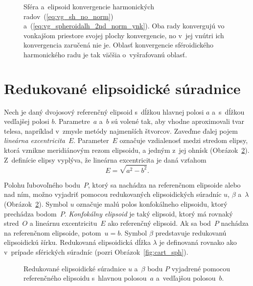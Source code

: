 \documentclass[a4paper, 12pt]{book}
\begin{document}
\begin{figure}
\centering

\caption{Sféra a~elipsoid konvergencie harmonických 
radov~(\ref{eq:vg_sh_no_norm}) a~(\ref{eq:vg_spheroidalh_2nd_norm_ynk}).  Oba 
rady konvergujú vo vonkajšom priestore svojej plochy konvergencie, no v~jej 
vnútri ich konvergencia zaručená nie je.  Oblasť konvergencie sféroidického 
harmonického radu je tak väčšia o~vyšrafovanú oblasť.}
\label{fig:spheroidal_harmonics_convergence}
\end{figure}


\section{Redukované elipsoidické súradnice}
\label{sec:reduced_ell_coords}

Nech je daný dvojosový referenčný elipsoid s~dĺžkou hlavnej polosi $a$ 
a~s~dĺžkou vedľajšej polosi $b$.  Parametre~$a$ a~$b$ sú volené tak, aby vhodne 
aproximovali tvar telesa, napríklad v~zmysle metódy najmenších štvorcov.  
Zaveďme ďalej pojem \emph{lineárna excentricita}~$E$.  Parameter~$E$ označuje 
vzdialenosť medzi stredom elipsy, ktorá vznikne meridiánovým rezom elipsoidu, 
a jedným z~jej ohnísk (Obrázok~\ref{fig:reduced_ell_coords}).  Z~definície 
elipsy vyplýva, že lineárna excentricita je daná vzťahom
%
\begin{equation}
\label{eq:linear_eccentricity}
E = \sqrt{a^2 - b^2}{.}
\end{equation}

Polohu ľubovoľného bodu~$P$, ktorý sa nachádza na referenčnom elipsoide alebo 
nad ním, možno vyjadriť pomocou redukovaných elipsoidických súradníc $u$, 
$\beta$ a~$\lambda$ (Obrázok~\ref{fig:reduced_ell_coords}).  Symbol $u$ 
označuje malú polos konfokálneho elipsoidu, ktorý prechádza bodom~$P$.  
\emph{Konfokálny elipsoid} je taký elipsoid, ktorý má rovnaký stred~$O$ 
a lineárnu excentricitu~$E$ ako referenčný elipsoid.  Ak sa bod~$P$ nachádza na 
referenčnom elipsoide, potom~$u = b$.  Symbol $\beta$ predstavuje redukovanú 
elipsoidickú šírku.  Redukovaná elipsoidická dĺžka $\lambda$ je definovaná 
rovnako ako v~prípade sférických súradníc (pozri Obrázok~\ref{fig:cart_sph}).

\begin{figure}
\centering

\caption{Redukované elipsoidické súradnice $u$ a~$\beta$ bodu $P$ vyjadrené 
pomocou referenčného elipsoidu s~hlavnou polosou~$a$ a~vedľajšou polosou~$b$.}
\label{fig:reduced_ell_coords}
\end{figure}
\end{document}
